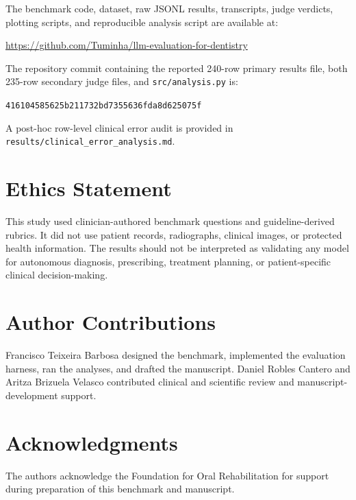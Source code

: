 \documentclass[11pt]{article}
\begin{document}
The benchmark code, dataset, raw JSONL results, transcripts, judge verdicts, plotting scripts, and reproducible analysis script are available at:
\begin{center}
\url{https://github.com/Tuminha/llm-evaluation-for-dentistry}
\end{center}
The repository commit containing the reported 240-row primary results file, both 235-row secondary judge files, and \texttt{src/analysis.py} is:
\begin{center}
\texttt{416104585625b211732bd7355636fda8d625075f}
\end{center}
A post-hoc row-level clinical error audit is provided in \texttt{results/clinical\_error\_analysis.md}.

\section{Ethics Statement}

This study used clinician-authored benchmark questions and guideline-derived rubrics.
It did not use patient records, radiographs, clinical images, or protected health information.
The results should not be interpreted as validating any model for autonomous diagnosis, prescribing, treatment planning, or patient-specific clinical decision-making.

\section{Author Contributions}

Francisco Teixeira Barbosa designed the benchmark, implemented the evaluation harness, ran the analyses, and drafted the manuscript.
Daniel Robles Cantero and Aritza Brizuela Velasco contributed clinical and scientific review and manuscript-development support.

\section{Acknowledgments}

The authors acknowledge the Foundation for Oral Rehabilitation for support during preparation of this benchmark and manuscript.
\end{document}

